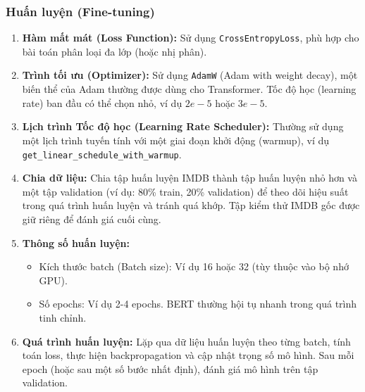 \subsubsection{Huấn luyện (Fine-tuning)}
\begin{enumerate}
    \item \textbf{Hàm mất mát (Loss Function):} Sử dụng \texttt{CrossEntropyLoss}, phù hợp cho bài toán phân loại đa lớp (hoặc nhị phân).
    \item \textbf{Trình tối ưu (Optimizer):} Sử dụng \texttt{AdamW} (Adam with weight decay), một biến thể của Adam thường được dùng cho Transformer. Tốc độ học (learning rate) ban đầu có thể chọn nhỏ, ví dụ $2e-5$ hoặc $3e-5$.
    \item \textbf{Lịch trình Tốc độ học (Learning Rate Scheduler):} Thường sử dụng một lịch trình tuyến tính với một giai đoạn khởi động (warmup), ví dụ \texttt{get\_linear\_schedule\_with\_warmup}. %
    \item \textbf{Chia dữ liệu:} Chia tập huấn luyện IMDB thành tập huấn luyện nhỏ hơn và một tập validation (ví dụ: 80\% train, 20\% validation) để theo dõi hiệu suất trong quá trình huấn luyện và tránh quá khớp. Tập kiểm thử IMDB gốc được giữ riêng để đánh giá cuối cùng.
    \item \textbf{Thông số huấn luyện:}
    \begin{itemize}
        \item Kích thước batch (Batch size): Ví dụ 16 hoặc 32 (tùy thuộc vào bộ nhớ GPU).
        \item Số epochs: Ví dụ 2-4 epochs. BERT thường hội tụ nhanh trong quá trình tinh chỉnh.
    \end{itemize}
    \item \textbf{Quá trình huấn luyện:} Lặp qua dữ liệu huấn luyện theo từng batch, tính toán loss, thực hiện backpropagation và cập nhật trọng số mô hình. Sau mỗi epoch (hoặc sau một số bước nhất định), đánh giá mô hình trên tập validation.
\end{enumerate}

